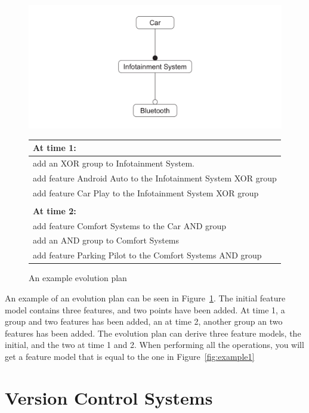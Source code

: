 \documentclass[a4paper,english]{ifimaster}
\begin{document}
\begin{figure}[htpb]
	\centering
	\includegraphics[width=0.8\linewidth]{illustrations/initial.pdf}
	\begin{tabular}{l}
		\textbf{At time 1:}                                           \\ \hline
		add an XOR group to Infotainment System.                      \\
		add feature Android Auto to the Infotainment System XOR group \\
		add feature Car Play to the Infotainment System XOR group     \\
		\\
		\textbf{At time 2:}                                           \\ \hline
		add feature Comfort Systems to the Car AND group              \\
		add an AND group to Comfort Systems                           \\
		add feature Parking Pilot to the Comfort Systems AND group
	\end{tabular}
	\caption{An example evolution plan}%
	\label{fig:exampleplan}
\end{figure}

An example of an evolution plan can be seen in Figure~\ref{fig:exampleplan}. The initial feature model contains three features, and two points have been added. At time 1, a group and two features has been added, an at time 2, another group an two features has been added. The evolution plan can derive three feature models, the initial, and the two at time 1 and 2. When performing all the operations, you will get a feature model that is equal to the one in Figure~\ref{fig:example1}

\section{Version Control Systems}%
\label{sec:version_control_systems}
\end{document}
